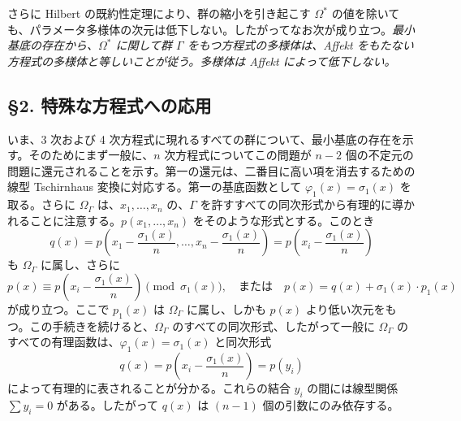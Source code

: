\documentclass[11pt]{article}
\begin{document}
さらに Hilbert の既約性定理により、群の縮小を引き起こす $\Omega^*$ の値を除いても、パラメータ多様体の次元は低下しない。したがってなお次が成り立つ。\emph{最小基底の存在から、$\Omega^*$ に関して群 $\Gamma$ をもつ方程式の多様体は、Affekt をもたない方程式の多様体と等しいことが従う。多様体は Affekt によって低下しない。}

\subsection*{\S 2. 特殊な方程式への応用}

いま、3 次および 4 次方程式に現れるすべての群について、最小基底の存在を示す。そのためにまず一般に、$n$ 次方程式についてこの問題が $n-2$ 個の不定元の問題に還元されることを示す。第一の還元は、二番目に高い項を消去するための線型 Tschirnhaus 変換に対応する。第一の基底函数として $\varphi_1(x)=\sigma_1(x)$ を取る。さらに $\Omega_\Gamma$ は、$x_1,
\ldots,x_n$ の、$\Gamma$ を許すすべての同次形式から有理的に導かれることに注意する。$p(x_1,
\ldots,x_n)$ をそのような形式とする。このとき
\[
q(x)=p\left(x_1-\frac{\sigma_1(x)}{n},\ldots,x_n-\frac{\sigma_1(x)}{n}\right)=p\left(x_i-\frac{\sigma_1(x)}{n}\right)
\]
も $\Omega_\Gamma$ に属し、さらに
\[
p(x)\equiv p\left(x_i-\frac{\sigma_1(x)}{n}\right)\pmod{\sigma_1(x)},
\quad\text{または}\quad
p(x)=q(x)+\sigma_1(x)\cdot p_1(x)
\]
が成り立つ。ここで $p_1(x)$ は $\Omega_\Gamma$ に属し、しかも $p(x)$ より低い次元をもつ。この手続きを続けると、$\Omega_\Gamma$ のすべての同次形式、したがって一般に $\Omega_\Gamma$ のすべての有理函数は、$\varphi_1(x)=\sigma_1(x)$ と同次形式
\[
q(x)=p\left(x_i-\frac{\sigma_1(x)}{n}\right)=p(y_i)
\]
によって有理的に表されることが分かる。これらの結合 $y_i$ の間には線型関係 $\sum y_i=0$ がある。したがって $q(x)$ は $(n-1)$ 個の引数にのみ依存する。
\end{document}
